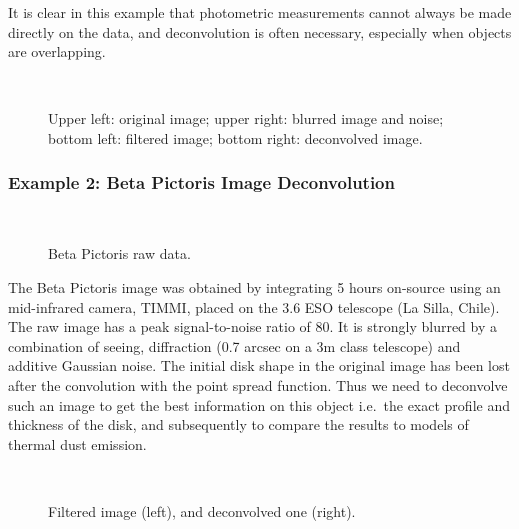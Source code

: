 \documentclass[11pt,a4paper]{article}
\begin{document}
It is clear in this example that photometric 
measurements  cannot always be made directly on the data, and 
deconvolution is often necessary, especially when objects are overlapping.\\
 
\bigskip
\begin{figure}[h]
\centerline{
\vbox{
\hbox{
}
\vspace{0.3cm}
\hbox{
}}}
\caption{Upper left: original image; upper right: blurred image and noise;
bottom left: filtered image; bottom right: deconvolved image.}
\label{fig_dec1}
\end{figure}

\subsubsection{Example 2: Beta Pictoris Image Deconvolution}

\begin{figure}[htb]
\centerline{
\hbox{
}}
\caption{Beta Pictoris raw data.}
\label{fig_dec2_1}
\end{figure}
The Beta Pictoris image \cite{starck:pan96} was obtained by integrating 5 hours on-source using an mid-infrared camera,
 TIMMI, placed on the 3.6 ESO telescope (La Silla, Chile). The raw image has
 a peak signal-to-noise ratio of 80. It is strongly blurred by a combination
of seeing, diffraction (0.7 arcsec on a 3m class telescope) and additive
Gaussian noise. The initial disk shape in the original image has been lost 
after the convolution with the point spread function. 
Thus we need to deconvolve such an image to get the best information
on this object i.e.\ the exact profile and thickness of the disk, and 
subsequently to compare the results to models of thermal dust emission.

\begin{figure}[htb]
\centerline{
\hbox{
}}
\caption{Filtered image (left), and deconvolved one (right).}
\label{fig_dec2_2}
\end{figure}
\end{document}

